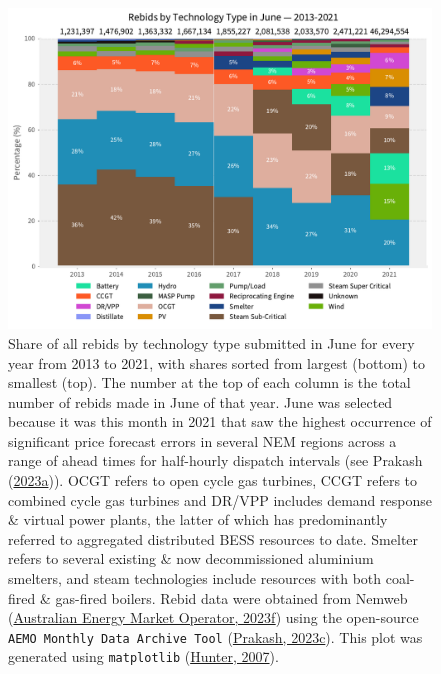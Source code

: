 \documentclass[12pt,a4paper,]{report}
\begin{document}
\begin{figure}
\hypertarget{fig:share_rebids_june_2013_2021}{%
\centering
\includegraphics{source/figures/rebids_june_share_by_tech_2013_2021.pdf}
\caption{Share of all rebids by technology type submitted in June for
every year from 2013 to 2021, with shares sorted from largest (bottom)
to smallest (top). The number at the top of each column is the total
number of rebids made in June of that year. June was selected because it
was this month in 2021 that saw the highest occurrence of significant
price forecast errors in several NEM regions across a range of ahead
times for half-hourly dispatch intervals (see Prakash
(\protect\hyperlink{ref-prakashEnergyPriceConvergence2023}{2023a})).
OCGT refers to open cycle gas turbines, CCGT refers to combined cycle
gas turbines and DR/VPP includes demand response \& virtual power
plants, the latter of which has predominantly referred to aggregated
distributed BESS resources to date. Smelter refers to several existing
\& now decommissioned aluminium smelters, and steam technologies include
resources with both coal-fired \& gas-fired boilers. Rebid data were
obtained from Nemweb
(\protect\hyperlink{ref-australianenergymarketoperatorNemwebMarketData2023}{Australian
Energy Market Operator, 2023f}) using the open-source
\texttt{AEMO\ Monthly\ Data\ Archive\ Tool}
(\protect\hyperlink{ref-prakashAEMOMonthlyData2023}{Prakash, 2023c}).
This plot was generated using \texttt{matplotlib}
(\protect\hyperlink{ref-hunterMatplotlib2DGraphics2007}{Hunter,
2007}).}\label{fig:share_rebids_june_2013_2021}
}
\end{figure}
\end{document}
